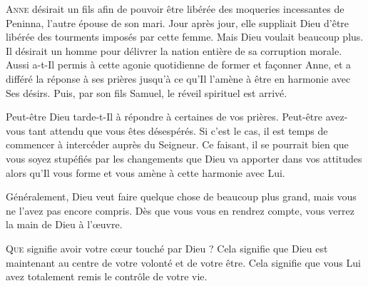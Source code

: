 
\lettrine{A}{nne} désirait un fils afin de pouvoir être libérée
 des moqueries incessantes de Peninna, l'autre épouse de son mari.
 Jour après jour, elle suppliait Dieu d'être libérée des tourments
 imposés par cette femme.
 Mais Dieu voulait beaucoup plus. Il désirait un homme pour délivrer
 la nation entière de sa corruption morale.
 Aussi a-t-Il permis à cette agonie quotidienne de former et fa\c{c}onner Anne,
 et a différé la réponse à ses prières jusqu'à ce qu'Il l'amène
 à être en harmonie avec Ses désirs.
 Puis, par son fils Samuel, le réveil spirituel est arrivé.

Peut-être Dieu tarde-t-Il à répondre à certaines de vos prières.
 Peut-être avez-vous tant attendu que vous êtes désespérés.
 Si c'est le cas, il est temps de commencer à intercéder auprès du Seigneur.
 Ce faisant, il se pourrait bien que vous soyez stupéfiés par les changements
 que Dieu va apporter dans vos attitudes alors qu'Il vous forme
 et vous amène à cette harmonie avec Lui.


Généralement, Dieu veut faire quelque chose de beaucoup plus grand,
 mais vous ne l'avez pas encore compris.
 Dès que vous vous en rendrez compte, vous verrez la main de Dieu à l'\oe{}uvre. 

\dvrule






\lettrine{Q}{ue} signifie avoir votre c\oe{}ur touché par Dieu ?
 Cela signifie que Dieu est maintenant au centre de votre volonté
 et de votre être.
 Cela signifie que vous Lui avez totalement remis le contrôle de votre vie.

